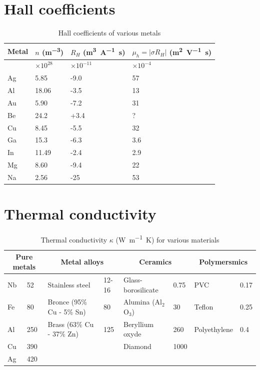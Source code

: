 \section{Hall coefficients}
\begin{table}[ht!]
    \centering
    \begin{tabular}{llll}
    \toprule
        Metal & $n$ (\si{\meter\tothe{-3}}) & $R_H$ (\si{\meter\tothe{3}\per\ampere\second}) & $\mu_h=|\sigma R_H|$ (\si{\square\meter\per\volt\second}) \\ \midrule
            & $\times 10^{28}$ & $\times 10^{-11}$ & $\times 10^{-4}$ \\
        Ag & 5.85 & -9.0 & 57 \\
        Al & 18.06 & -3.5 & 13 \\
        Au & 5.90 & -7.2 & 31 \\
        Be & 24.2 & +3.4 & ? \\
        Cu & 8.45 & -5.5 & 32 \\
        Ga & 15.3 & -6.3 & 3.6 \\
        In & 11.49 & -2.4 & 2.9 \\
        Mg & 8.60 & -9.4 & 22 \\
        Na & 2.56 & -25 & 53 \\
    \bottomrule
    \end{tabular}
    \caption{Hall coefficients of various metals}
    \label{app:Hall}
\end{table}

\section{Thermal conductivity}
\begin{table}[ht!]
    \centering
    \begin{tabular}{llllllll}
    \toprule
        \multicolumn{2}{c}{Pure metals} & \multicolumn{2}{c}{Metal alloys} & \multicolumn{2}{c}{Ceramics} & \multicolumn{2}{c}{Polymersmics} \\\midrule
        Nb & 52 & Stainless steel & 12-16 & Glass-borosilicate & 0.75 & PVC & 0.17 \\
        Fe & 80 & Bronce (95\% Cu - 5\% Sn) & 80 & Alumina (Al$_2$O$_3$) & 30 & Teflon & 0.25 \\
        Al & 250 & Brass (63\% Cu - 37\% Zn) & 125 & Beryllium oxyde & 260 & Polyethylene & 0.4 \\
        Cu & 390 && & Diamond & 1000 && \\
        Ag & 420 && && && \\
    \bottomrule
    \end{tabular}
    \caption{Thermal conductivity $\kappa$ (\si{\watt\per\meter\kelvin}) for various materials}
    \label{app:thermalcond}
\end{table}

